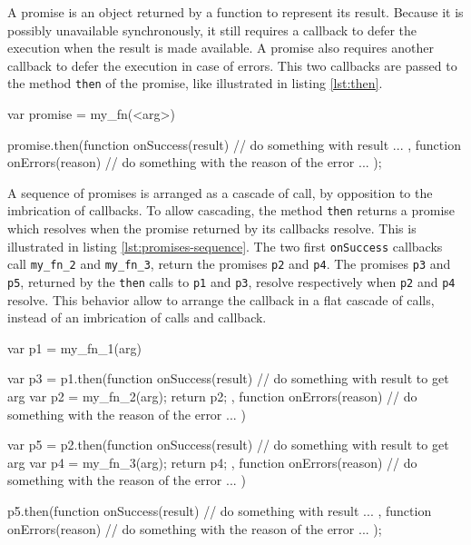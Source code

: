A promise is an object returned by a function to represent its result.
Because it is possibly unavailable synchronously, it still requires a callback to defer the execution when the result is made available.
A promise also requires another callback to defer the execution in case of errors.
This two callbacks are passed to the method \texttt{then} of the promise, like illustrated in listing \ref{lst:then}.

\begin{code}[js, %
             caption={Example of a promise}, %
             label={lst:then}] %
var promise = my_fn(<arg>)

promise.then(function onSuccess(result) {
  // do something with result ...
}, function onErrors(reason) {
  // do something with the reason of the error ...
});
\end{code}

A sequence of promises is arranged as a cascade of call, by opposition to the imbrication of callbacks.
To allow cascading, the method \texttt{then} returns a promise which resolves when the promise returned by its callbacks resolve.
This is illustrated in listing \ref{lst:promises-sequence}.
The two first \texttt{onSuccess} callbacks call \texttt{my\_fn\_2} and \texttt{my\_fn\_3}, return the promises \texttt{p2} and \texttt{p4}.
The promises \texttt{p3} and \texttt{p5}, returned by the \texttt{then} calls to \texttt{p1} and \texttt{p3}, resolve respectively when \texttt{p2} and \texttt{p4} resolve.
This behavior allow to arrange the callback in a flat cascade of calls, instead of an imbrication of calls and callback.

\begin{code}[js, %
             caption={Example of a sequence of promise}, %
             label={lst:promises-sequence}] %
var p1 = my_fn_1(arg)

var p3 = p1.then(function onSuccess(result) {
  // do something with result to get arg
  var p2 = my_fn_2(arg);
  return p2;
}, function onErrors(reason) {
  // do something with the reason of the error ...
})

var p5 = p2.then(function onSuccess(result) {
  // do something with result to get arg
  var p4 = my_fn_3(arg);
  return p4;
}, function onErrors(reason) {
  // do something with the reason of the error ...
})

p5.then(function onSuccess(result) {
  // do something with result ...
}, function onErrors(reason) {
  // do something with the reason of the error ...
});
\end{code}

